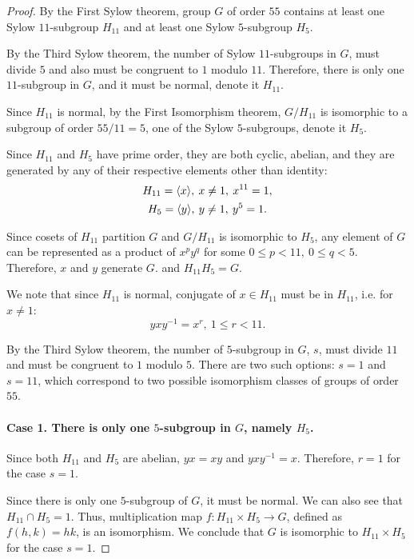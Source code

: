 \documentclass{article}
\theoremstyle{definition}
\DeclarePairedDelimiter\genby{\langle}{\rangle}
\begin{document}
\begin{proof}

By the First Sylow theorem, group $G$ of order $55$ contains at least one Sylow $11$-subgroup $H_{11}$ and at least one Sylow $5$-subgroup $H_5$.

By the Third Sylow theorem, the number of Sylow $11$-subgroups in $G$, must divide $5$ and also must be congruent to $1$ modulo $11$.
Therefore, there is only one $11$-subgroup in $G$, and it must be normal, denote it $H_{11}$.

Since $H_{11}$ is normal, by the First Isomorphism theorem, $G/H_{11}$ is isomorphic to a subgroup of order $55/11=5$, one of the Sylow $5$-subgroups, denote it $H_{5}$.

Since $H_{11}$ and $H_{5}$ have prime order, they are both cyclic, abelian, and they are generated by any of their respective elements other than identity:
\begin{gather*}
    H_{11} = \genby{x}, \> x \neq 1, \> x^{11}=1, \\
    H_{5} = \genby{y}, \> y \neq 1, \> y^{5}=1.
\end{gather*}

Since cosets of $H_{11}$ partition $G$ and $G / H_{11}$ is isomorphic to $H_{5}$, any element of $G$ can be represented as a product of $x^p y^q$ for some $0 \leq p < 11, \> 0 \leq q < 5$.
Therefore, $x$ and $y$ generate $G$. and $H_{11} H_{5} = G$.

We note that since $H_{11}$ is normal, conjugate of $x \in H_{11}$ must be in $H_{11}$, i.e. for $x \neq 1$:
\[
    yxy^{-1} = x^r, \> 1 \leq r < 11.
\]

By the Third Sylow theorem, the number of $5$-subgroup in $G$, $s$, must divide $11$ and must be congruent to $1$ modulo $5$.
There are two such options: $s=1$ and $s=11$, which correspond to two possible isomorphism classes of groups of order $55$.

\paragraph{Case 1. There is only one $5$-subgroup in $G$, namely $H_{5}$.}

Since both $H_{11}$ and $H_{5}$ are abelian, $yx = xy$ and $yxy^{-1} = x$.
Therefore, $r = 1$ for the case $s=1$.

Since there is only one $5$-subgroup of $G$, it must be normal.
We can also see that $H_{11} \cap H_{5} = 1$.
Thus, multiplication map $f:H_{11} \times H_{5} \to G$, defined as $f(h,k) = hk$, is an isomorphism.
We conclude that $G$ is isomorphic to $H_{11} \times H_{5}$ for the case $s=1$.


\end{proof}
\end{document}
